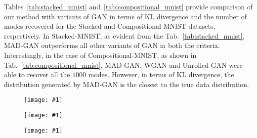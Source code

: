 Tables~\ref{tab:stacked_mnist} and~\ref{tab:compositional_mnist} provide comparison of our method with variants of GAN in terms of KL divergence and the number of modes recovered for the Stacked and Compositional MNIST datasets, respectively. In Stacked-MNIST, as evident from the Tab.~\ref{tab:stacked_mnist}, MAD-GAN outperforms all other variants of GAN in both the criteria. Interestingly, in the case of Compositional-MNIST, as shown in Tab.~\ref{tab:compositional_mnist}, MAD-GAN, WGAN and Unrolled GAN were able to recover all the $1000$ modes. However, in terms of KL divergence, the distribution generated by MAD-GAN is the closest to the true data distribution.


\begin{figure}
	\centering
	\label{fig:image2imageNight}
	\vspace{-4mm}
\end{figure}

\newcommand{\addSubFigThird}[2]{\begin{subfigure}{.31\linewidth}
		\centering
		\texttt{[image: \#1]}
		\label{#2}\vspace{-3mm}\end{subfigure}
}

\begin{figure*}
	\centering
	\addSubFigThird{faces_gen1}{fig:fg1} 
	\addSubFigThird{faces_gen2}{fig:fg2}
	\addSubFigThird{faces_gen3}{fig:fg3}
	\label{fig:faces}
	\vspace{-3mm}
\end{figure*}

